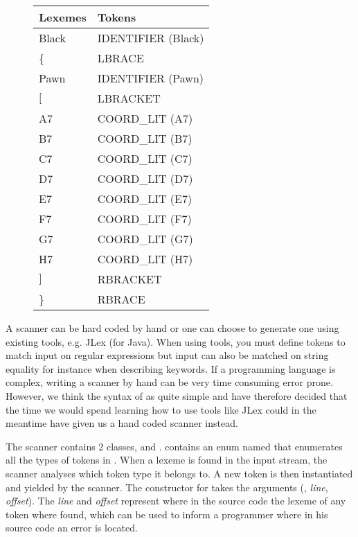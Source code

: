 \begin{figure}
\centering
\begin{tabular}{|l|l|}
        \hline
        Lexemes & Tokens             \\ \hline
        Black   & IDENTIFIER (Black) \\ 
        \{       & LBRACE             \\ 
        Pawn    & IDENTIFIER (Pawn)  \\ 
        $[$       & LBRACKET           \\ 
        A7      & COORD\_LIT (A7)     \\ 
        B7      & COORD\_LIT (B7)     \\ 
        C7      & COORD\_LIT (C7)     \\ 
        D7      & COORD\_LIT (D7)     \\ 
        E7      & COORD\_LIT (E7)     \\ 
        F7      & COORD\_LIT (F7)     \\ 
        G7      & COORD\_LIT (G7)     \\ 
        H7      & COORD\_LIT (H7)     \\ 
        $]$       & RBRACKET           \\ 
        \}       & RBRACE             \\
        \hline
\end{tabular}
\label{table:lexemestotokens}
\end{figure}

A scanner can be hard coded by hand or one can choose to generate one using existing tools, e.g. JLex (for Java). When using tools, you must define tokens to match input on regular expressions but input can also be matched on string equality for instance when describing keywords. If a programming language is complex, writing a scanner by hand can be very time consuming error prone. However, we think the syntax of \productname{} as quite simple and have therefore decided that the time we would spend learning how to use tools like JLex could in the meantime have given us a hand coded scanner instead.

The scanner contains 2 classes,  and .  contains an enum named  that enumerates all the types of tokens in \productname{}. When a lexeme is found in the input stream, the scanner analyses which token type it belongs to. A new token is then instantiated and yielded by the scanner. The constructor for  takes the arguments (, \textit{line}, \textit{offset}). The \textit{line} and \textit{offset} represent where in the source code the lexeme of any token where found, which can be used to inform a programmer where in his source code an error is located.
 
